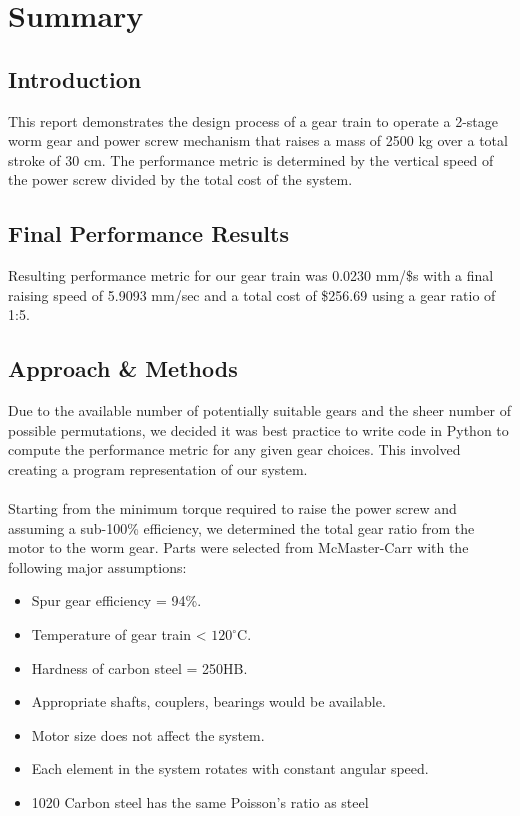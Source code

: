\documentclass[letterpaper,12pt]{article}
\begin{document}
\section{Summary}

\subsection{Introduction}
This report demonstrates the design process of a gear train to operate a 2-stage worm gear and power screw mechanism that raises a mass of 2500 kg over a total stroke of 30 cm. The performance metric is determined by the vertical speed of the power screw divided by the total cost of the system. 

\subsection{Final Performance Results}
Resulting performance metric for our gear train was 0.0230 mm/\$s with a final raising speed of 5.9093 mm/sec and a total cost of \$256.69 using a gear ratio of 1:5. 

\subsection{Approach \& Methods}
Due to the available number of potentially suitable gears and the sheer number of possible permutations, we decided it was best practice to write code in Python to compute the performance metric for any given gear choices. This involved creating a program representation of our system.
\\\\
Starting from the minimum torque required to raise the power screw and assuming a sub-100\% efficiency, we determined the total gear ratio from the motor to the worm gear. Parts were selected from McMaster-Carr with the following major assumptions:
\begin{itemize}
    \itemsep0em
    \item Spur gear efficiency = 94\%.
    \item Temperature of gear train < $120^{\circ}$C.
    \item Hardness of carbon steel = 250HB.
    \item Appropriate shafts, couplers, bearings would be available.
    \item Motor size does not affect the system.
    \item Each element in the system rotates with constant angular speed.
    \item 1020 Carbon steel has the same Poisson's ratio as steel
\end{itemize}
\end{document}
